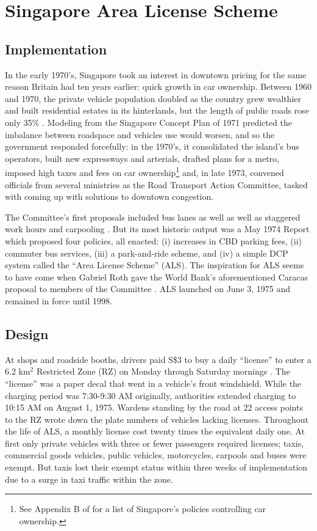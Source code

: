 \section{Singapore Area License Scheme}\label{sec:als}

\subsection{Implementation}

In the early 1970's, Singapore took an interest in downtown pricing for the same reason Britain had ten years earlier: quick growth in car ownership. Between 1960 and 1970, the private vehicle population doubled as the country grew wealthier and built residential estates in its hinterlands, but the length of public roads rose only 35\% \citep{Santos2004}. Modeling from the Singapore Concept Plan of 1971 predicted the imbalance between roadspace and vehicles use would worsen, and so the government responded forcefully: in the 1970's, it consolidated the island's bus operators, built new expressways and arterials, drafted plans for a metro, imposed high taxes and fees on car ownership\footnote{See Appendix B of \citet{Gomez-Ibanez1994} for a list of Singapore's policies controlling car ownership.} and, in late 1973, convened officials from several ministries as the Road Transport Action Committee, tasked with coming up with solutions to downtown congestion. 

The Committee's first proposals included bus lanes as well as well as staggered work hours and carpooling \citep{Chin1998}. But its most historic output was a May 1974 Report \citep{SRTAC1974} which proposed four policies, all enacted: (i) increases in CBD parking fees, (ii) commuter bus services, (iii) a park-and-ride scheme, and (iv) a simple DCP system called the ``Area License Scheme'' (ALS). The inspiration for ALS seems to have come when Gabriel Roth gave the World Bank's aforementioned Caracas proposal to members of the Committee \citep{Roth2016}. ALS launched on June 3, 1975 and remained in force until 1998.

\subsection{Design}

At shops and roadside booths, drivers paid S\$3 to buy a daily ``license'' to enter a 6.2 km$^{2}$ Restricted Zone (RZ) on Monday through Saturday mornings \citep{WatsonHolland1978}. The ``license'' was a paper decal that went in a vehicle's front windshield. While the charging period was 7:30-9:30 AM originally, authorities  extended charging to 10:15 AM on August 1, 1975. Wardens standing by the road at 22 access points to the RZ wrote down the plate numbers of vehicles lacking licenses. Throughout the life of ALS, a monthly license cost twenty times the equivalent daily one. At first only private vehicles with three or fewer passengers required licenses; taxis, commercial goods vehicles, public vehicles, motorcycles, carpools and buses were exempt. But taxis lost their exempt status within three weeks of implementation due to a surge in taxi traffic within the zone. 

